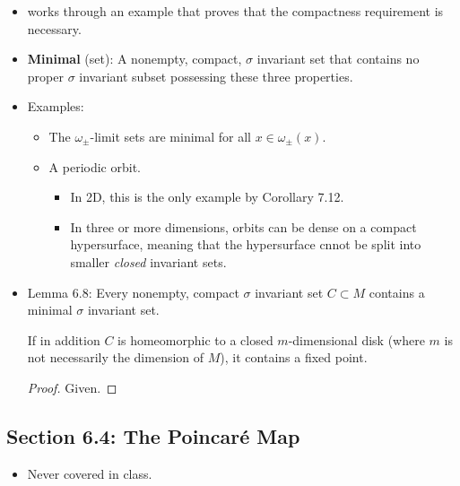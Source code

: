 \documentclass[../notes.tex]{subfiles}
\begin{document}
\begin{itemize}
\begin{proof}
    \end{proof}
    \item \textcite{bib:Teschl} works through an example that proves that the compactness requirement is necessary.
    \item \textbf{Minimal} (set): A nonempty, compact, $\sigma$ invariant set that contains no proper $\sigma$ invariant subset possessing these three properties.
    \item Examples:
    \begin{itemize}
        \item The $\omega_\pm$-limit sets are minimal for all $x\in\omega_\pm(x)$.
        \item A periodic orbit.
        \begin{itemize}
            \item In 2D, this is the only example by Corollary 7.12.
            \item In three or more dimensions, orbits can be dense on a compact hypersurface, meaning that the hypersurface cnnot be split into smaller \emph{closed} invariant sets.
        \end{itemize}
    \end{itemize}
    \item Lemma 6.8: Every nonempty, compact $\sigma$ invariant set $C\subset M$ contains a minimal $\sigma$ invariant set.\par
    If in addition $C$ is homeomorphic to a closed $m$-dimensional disk (where $m$ is not necessarily the dimension of $M$), it contains a fixed point.
    \begin{proof}
        Given.
    \end{proof}
\end{itemize}


\subsection*{Section 6.4: The Poincar\'{e} Map}
\begin{itemize}
    \item Never covered in class.
\end{itemize}
\end{document}
